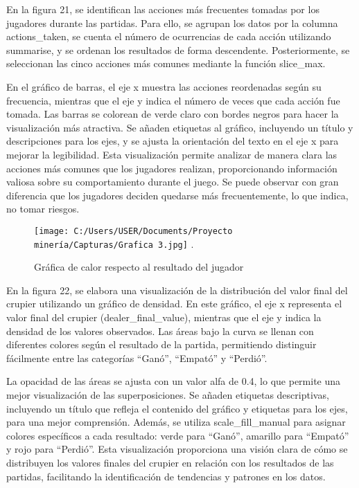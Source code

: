 \documentclass[conference,final,]{IEEEtran}
\begin{document}
En la figura 21, se identifican las acciones más frecuentes tomadas por
los jugadores durante las partidas. Para ello, se agrupan los datos por
la columna actions\_taken, se cuenta el número de ocurrencias de cada
acción utilizando summarise, y se ordenan los resultados de forma
descendente. Posteriormente, se seleccionan las cinco acciones más
comunes mediante la función slice\_max.

En el gráfico de barras, el eje x muestra las acciones reordenadas según
su frecuencia, mientras que el eje y indica el número de veces que cada
acción fue tomada. Las barras se colorean de verde claro con bordes
negros para hacer la visualización más atractiva. Se añaden etiquetas al
gráfico, incluyendo un título y descripciones para los ejes, y se ajusta
la orientación del texto en el eje x para mejorar la legibilidad. Esta
visualización permite analizar de manera clara las acciones más comunes
que los jugadores realizan, proporcionando información valiosa sobre su
comportamiento durante el juego. Se puede observar con gran diferencia
que los jugadores deciden quedarse más frecuentemente, lo que indica, no
tomar riesgos.

\begin{figure}[htbp]
\centering
\texttt{[image: C:/Users/USER/Documents/Proyecto minería/Capturas/Grafica 3.jpg]}
\DeclareGraphicsExtensions.
\caption{Gráfica de calor respecto al resultado del jugador}
\label{Dataset 10}
\end{figure}

En la figura 22, se elabora una visualización de la distribución del
valor final del crupier utilizando un gráfico de densidad. En este
gráfico, el eje x representa el valor final del crupier
(dealer\_final\_value), mientras que el eje y indica la densidad de los
valores observados. Las áreas bajo la curva se llenan con diferentes
colores según el resultado de la partida, permitiendo distinguir
fácilmente entre las categorías ``Ganó'', ``Empató'' y ``Perdió''.

La opacidad de las áreas se ajusta con un valor alfa de 0.4, lo que
permite una mejor visualización de las superposiciones. Se añaden
etiquetas descriptivas, incluyendo un título que refleja el contenido
del gráfico y etiquetas para los ejes, para una mejor comprensión.
Además, se utiliza scale\_fill\_manual para asignar colores específicos
a cada resultado: verde para ``Ganó'', amarillo para ``Empató'' y rojo
para ``Perdió''. Esta visualización proporciona una visión clara de cómo
se distribuyen los valores finales del crupier en relación con los
resultados de las partidas, facilitando la identificación de tendencias
y patrones en los datos.
\end{document}
